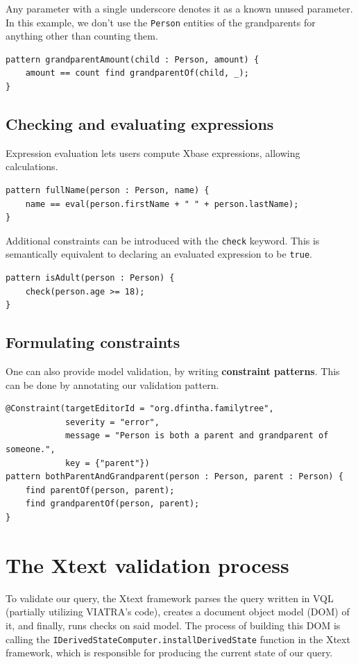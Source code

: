 \documentclass[11pt,a4paper,oneside]{report}
\begin{document}
Any parameter with a single underscore denotes it as a known unused parameter.
In this example, we don't use the \texttt{Person} entities of the grandparents
for anything other than counting them.

\begin{lstlisting}[frame=single]
pattern grandparentAmount(child : Person, amount) {
    amount == count find grandparentOf(child, _);
}
\end{lstlisting}

\subsection{Checking and evaluating expressions}
Expression evaluation lets users compute Xbase expressions, allowing calculations.

\begin{lstlisting}[frame=single]
pattern fullName(person : Person, name) {
    name == eval(person.firstName + " " + person.lastName);
}
\end{lstlisting}

Additional constraints can be introduced with the \texttt{check} keyword. This
is semantically equivalent to declaring an evaluated expression to be
\texttt{true}.

\begin{lstlisting}[frame=single]
pattern isAdult(person : Person) {
    check(person.age >= 18);
}
\end{lstlisting}

\subsection{Formulating constraints}
One can also provide model validation, by writing \textbf{constraint patterns}.
This can be done by annotating our validation pattern.

\begin{lstlisting}[frame=single]
@Constraint(targetEditorId = "org.dfintha.familytree",
            severity = "error",
            message = "Person is both a parent and grandparent of someone.",
            key = {"parent"})
pattern bothParentAndGrandparent(person : Person, parent : Person) {
    find parentOf(person, parent);
    find grandparentOf(person, parent);
}
\end{lstlisting}

\section{The Xtext validation process}
To validate our query, the Xtext framework parses the query written in VQL
(partially utilizing VIATRA's code), creates a document object model (DOM) of
it, and finally, runs checks on said model. The process of building this DOM is
calling the \texttt{IDerivedStateComputer.installDerivedState} function in the
Xtext framework, which is responsible for producing the current state of our
query.
\end{document}
